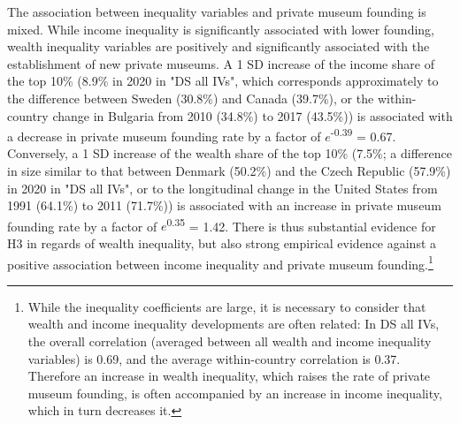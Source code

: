 \documentclass[11pt, authoryear]{elsarticle}
\begin{document}
The association between inequality variables and private museum founding is mixed.
While income inequality is significantly associated with lower founding, wealth inequality variables are positively and significantly associated with the establishment of new private museums. 
A 1 SD increase of the income share of the top 10\% (8.9\% in 2020 in "DS all IVs", which corresponds approximately to the difference between Sweden (30.8\%) and Canada (39.7\%), or the within-country change in Bulgaria from 2010 (34.8\%) to 2017 (43.5\%)) is associated with a decrease in private museum founding rate by a factor of \(e\)\textsuperscript{-0.39} = 0.67. 
Conversely, a 1 SD increase of the wealth share of the top 10\% (7.5\%; a difference in size similar to that between Denmark (50.2\%) and the Czech Republic (57.9\%) in 2020 in "DS all IVs", or to the longitudinal change in the United States from 1991 (64.1\%) to 2011 (71.7\%)) is associated with an increase in private museum founding rate by a factor of \(e\)\textsuperscript{0.35} = 1.42.
There is thus substantial evidence for H3 in regards of wealth inequality, but also strong empirical evidence against a positive association between income inequality and private museum founding.\footnote{While the inequality coefficients are large, it is necessary to consider that wealth and income inequality developments are often related:
In DS all IVs, the overall correlation (averaged between all wealth and income inequality variables) is 0.69, and the average within-country correlation is 0.37.
Therefore an increase in wealth inequality, which raises the rate of private museum founding, is often accompanied by an increase in income inequality, which in turn decreases it.}
\end{document}
